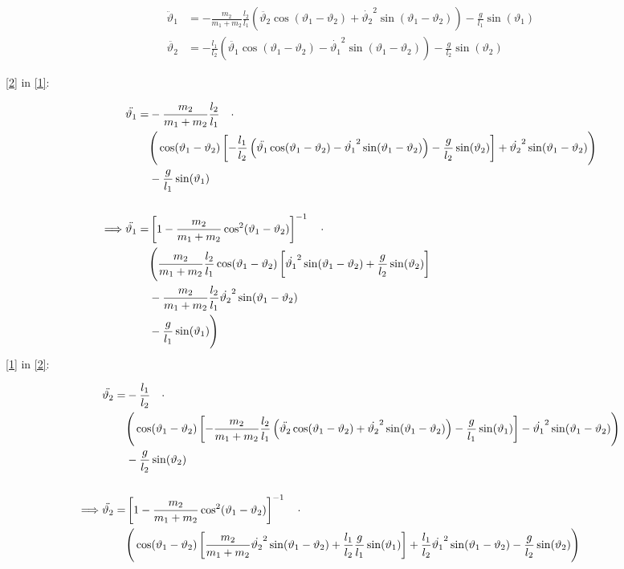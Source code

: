 \documentclass[preview,a4paper,8pt]{standalone}
\begin{document}
\begin{align}
\ddot{\vartheta}_1 &= -\frac{m_2}{m_1+m_2}\frac{l_2}{l_1}\left(\ddot{\vartheta_2}\cos(\vartheta_1-\vartheta_2)+\dot{\vartheta_2}^2\sin(\vartheta_1-\vartheta_2)\right)- \frac{g}{l_1}\sin(\vartheta_1) \label{1}\\
\ddot{\vartheta_2} &= -\frac{l_1}{l_2}\left(\ddot{\vartheta_1}\cos(\vartheta_1-\vartheta_2) - \dot{\vartheta_1}^2\sin(\vartheta_1-\vartheta_2)\right)-\frac{g}{l_2}\sin(\vartheta_2) \label{2}
\end{align}

\eqref{2} in \eqref{1}:

\begin{align}
\ddot{\vartheta_1} =&
-\frac{m_2}{m_1+m_2}\frac{l_2}{l_1}\quad\cdot\nonumber\\
&\Bigg(
\cos(\vartheta_1-\vartheta_2)
\left[
-\frac{l_1}{l_2}\left(\ddot{\vartheta_1}\cos(\vartheta_1-\vartheta_2) - \dot{\vartheta_1}^2\sin(\vartheta_1-\vartheta_2)\right)-\frac{g}{l_2}\sin(\vartheta_2)
\right]
+\dot{\vartheta_2}^2\sin(\vartheta_1-\vartheta_2)
\Bigg) \nonumber\\
&-\frac{g}{l_1}\sin(\vartheta_1)\nonumber\\
\nonumber\hfill \\
\Longrightarrow \ddot{\vartheta_1} =& \left[1-\frac{m_2}{m_1+m_2}\cos^2(\vartheta_1-\vartheta_2)\right]^{-1}\quad\cdot \nonumber\\
&\Bigg(
\frac{m_2}{m_1+m_2}\frac{l_2}{l_1}\cos(\vartheta_1-\vartheta_2)
\left[\dot{\vartheta_1}^2\sin(\vartheta_1-\vartheta_2)
+\frac{g}{l_2}\sin(\vartheta_2)
\right] \nonumber\\
&- \frac{m_2}{m_1+m_2}\frac{l_2}{l_1}\dot{\vartheta_2}^2\sin(\vartheta_1-\vartheta_2)\nonumber\\
&- \frac{g}{l_1}\sin(\vartheta_1)
\Bigg)
\end{align}
\eqref{1} in \eqref{2}:

\begin{align}
\ddot{\vartheta_2} =&
-\frac{l_1}{l_2}\quad\cdot \nonumber\\
&\Bigg(
\cos(\vartheta_1-\vartheta_2)\left[-\frac{m_2}{m_1+m_2}\frac{l_2}{l_1}\left(\ddot{\vartheta_2}\cos(\vartheta_1-\vartheta_2)+\dot{\vartheta_2}^2\sin(\vartheta_1-\vartheta_2)\right)- \frac{g}{l_1}\sin(\vartheta_1)\right]
-\dot{\vartheta_1}^2\sin(\vartheta_1-\vartheta_2)
\Bigg)\nonumber \\
&-\frac{g}{l_2}\sin(\vartheta_2)\nonumber\\
\hfill\nonumber\\
\Longrightarrow \ddot{\vartheta_2} =& \left[1-\frac{m_2}{m_1+m_2}\cos^2(\vartheta_1-\vartheta_2)\right]^{-1}\quad\cdot \nonumber\\
&\Bigg(
\cos(\vartheta_1-\vartheta_2)\left[\frac{m_2}{m_1+m_2}\dot{\vartheta_2}^2\sin(\vartheta_1-\vartheta_2)+\frac{l_1}{l_2}\frac{g}{l_1}\sin(\vartheta_1)\right] + \frac{l_1}{l_2}\dot{\vartheta_1}^2\sin(\vartheta_1-\vartheta_2)
-\frac{g}{l_2}\sin(\vartheta_2)
\Bigg)
\end{align}
\end{document}
